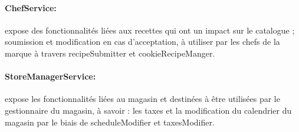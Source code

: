 \paragraph{ChefService:} expose des fonctionnalités liées aux recettes qui ont un impact sur le catalogue ; soumission et modification en cas d'acceptation, à utiliser par les chefs de la marque à travers recipeSubmitter et cookieRecipeManger.
\paragraph{StoreManagerService:} expose les fonctionnalités liées au magasin et destinées à être utilisées par le gestionnaire du magasin, à savoir : les taxes et la modification du calendrier du magasin par le biais de scheduleModifier et taxesModifier.
